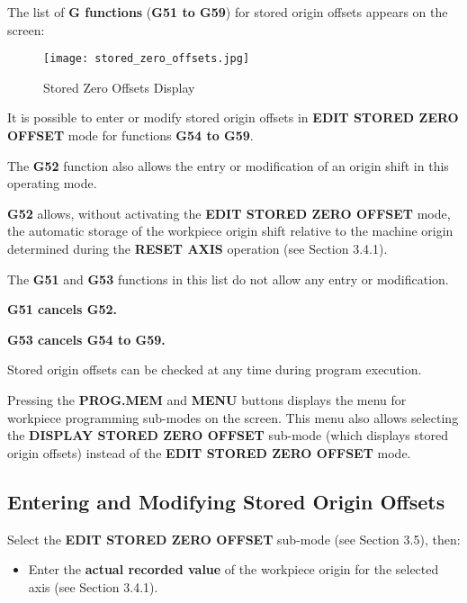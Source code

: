 \newpage

The list of \textbf{G functions} (\textbf{G51 to G59}) for stored origin offsets appears on the screen:

\begin{figure}[h]
    \centering
    \texttt{[image: stored\_zero\_offsets.jpg]}
    \caption{Stored Zero Offsets Display}
\end{figure}

It is possible to enter or modify stored origin offsets in \textbf{EDIT STORED ZERO OFFSET} mode for functions \textbf{G54 to G59}.

The \textbf{G52} function also allows the entry or modification of an origin shift in this operating mode.

\textbf{G52} allows, without activating the \textbf{EDIT STORED ZERO OFFSET} mode, the automatic storage of the workpiece origin shift relative to the machine origin determined during the \textbf{RESET AXIS} operation (see Section 3.4.1).

The \textbf{G51} and \textbf{G53} functions in this list do not allow any entry or modification.

\textbf{G51 cancels G52.}

\textbf{G53 cancels G54 to G59.}

\notes

Stored origin offsets can be checked at any time during program execution.

Pressing the \textbf{PROG.MEM} and \textbf{MENU} buttons displays the menu for workpiece programming sub-modes on the screen. This menu also allows selecting the \textbf{DISPLAY STORED ZERO OFFSET} sub-mode (which displays stored origin offsets) instead of the \textbf{EDIT STORED ZERO OFFSET} mode.

\newpage

\subsection{Entering and Modifying Stored Origin Offsets}

Select the \textbf{EDIT STORED ZERO OFFSET} sub-mode (see Section 3.5), then:

\begin{itemize}
    \item Enter the \textbf{actual recorded value} of the workpiece origin for the selected axis (see Section 3.4.1).
    \vspace{.6cm}
\end{itemize}


